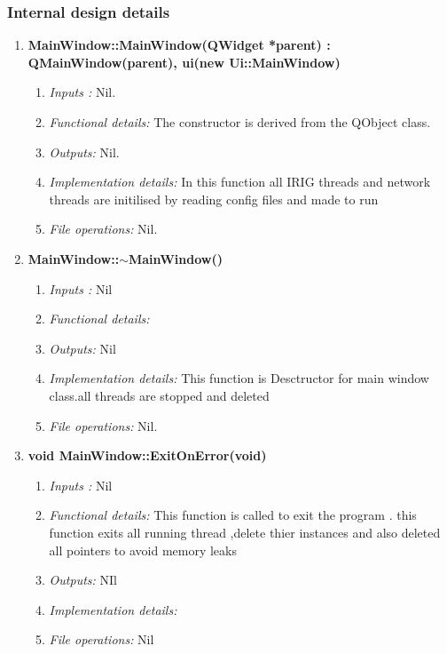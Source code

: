 \subsubsection{Internal design details }
\begin{enumerate}
	\item  \textbf{MainWindow::MainWindow(QWidget *parent) :
    QMainWindow(parent),
    ui(new Ui::MainWindow)}
	\begin{enumerate}
		\item \textit{Inputs :} Nil.
		\item \textit{Functional details:} The constructor is derived from the QObject class.
		\item \textit{Outputs:} Nil.
		\item \textit{Implementation details:} In this function all IRIG threads and network threads are initilised by reading config files and made to run 
		\item \textit{File operations:} Nil.
	\end{enumerate}
	
	\item  \textbf{MainWindow::$ \sim $MainWindow()}
	\begin{enumerate}
		\item \textit{Inputs :} Nil
		\item \textit{Functional details:} 
		\item \textit{Outputs:} Nil
		\item \textit{Implementation details:} This function is Desctructor for main window class.all threads are stopped and deleted 
		\item \textit{File operations:} Nil.
	\end{enumerate}
	
	\item  \textbf{void MainWindow::ExitOnError(void)}
	\begin{enumerate}
		\item \textit{Inputs :} Nil
		\item \textit{Functional details:} This function is called to exit the program . this function exits all running thread ,delete thier instances  and also deleted all pointers to avoid memory leaks
		\item \textit{Outputs:} NIl
		\item \textit{Implementation details:} 
		\item \textit{File operations:} Nil
	\end{enumerate}
	

\end{enumerate}
